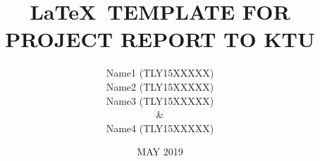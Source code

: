 \documentclass[BTech]{cetlyproj}
\begin{document}
\title{\LaTeX\ TEMPLATE FOR PROJECT REPORT TO KTU}
\author{Name1 (TLY15XXXXX)\\Name2 (TLY15XXXXX)\\Name3 (TLY15XXXXX)\\ \& \\Name4 (TLY15XXXXX)}

\date{MAY 2019}

\maketitle

\declaration

\vspace*{0.25in}
\end{document}
